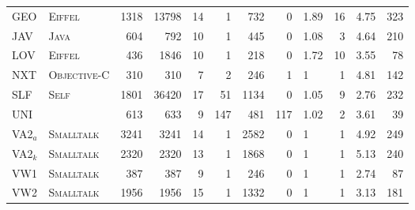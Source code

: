 \begin{figure}[htbp]
\begin{tabular}{@{ }l@{ }||@{ }l@{ }|@{ }r@{ }|@{ }r@{ }|@{ }r@{ }|@{ }r@{ }|@{ }r@{ }|@{ }r@{ }|@{ }l@{ }|@{ }r@{ }|@{ }r@{ }|@{ }r@{ }}
 GEO & \tiny{\textsc{Eiffel}}      & 1318 & 13798 & 14 &   1 &  732 &   0 & 1.89 & 16 & 4.75 & 323 \\ %
 JAV & \tiny{\textsc{Java}}        &  604 &   792 & 10 &   1 &  445 &   0 & 1.08 &  3 & 4.64 & 210 \\ %
 LOV & \tiny{\textsc{Eiffel}}      &  436 &  1846 & 10 &   1 &  218 &   0 & 1.72 & 10 & 3.55 &  78 \\ %
 NXT & \tiny{\textsc{Objective-C}} &  310 &   310 &  7 &   2 &  246 &   1 & 1    &  1 & 4.81 & 142 \\ %
 SLF & \tiny{\textsc{Self}}        & 1801 & 36420 & 17 &  51 & 1134 &   0 & 1.05 &  9 & 2.76 & 232 \\ %
 UNI & \tiny{\textsc{\Cpp{}}}      &  613 &   633 &  9 & 147 &  481 & 117 & 1.02 &  2 & 3.61 &  39 \\ %
 VA2$_a$& \tiny{\textsc{Smalltalk}}& 3241 &  3241 & 14 &   1 & 2582 &   0 & 1    &  1 & 4.92 & 249 \\ %
 VA2$_k$& \tiny{\textsc{Smalltalk}}& 2320 &  2320 & 13 &   1 & 1868 &   0 & 1    &  1 & 5.13 & 240 \\ %
 VW1 & \tiny{\textsc{Smalltalk}}   &  387 &   387 &  9 &   1 &  246 &   0 & 1    &  1 & 2.74 &  87 \\ %
 VW2 & \tiny{\textsc{Smalltalk}}   & 1956 &  1956 & 15 &   1 & 1332 &   0 & 1    &  1 & 3.13 & 181 \\ %

\end{tabular}
\end{figure}
